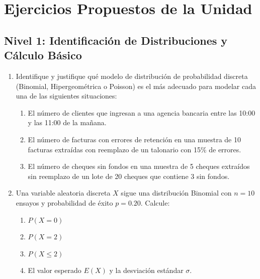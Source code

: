 \section{Ejercicios Propuestos de la Unidad}

\subsection*{Nivel 1: Identificación de Distribuciones y Cálculo Básico}
\begin{enumerate}
    \item Identifique y justifique qué modelo de distribución de probabilidad discreta (Binomial, Hipergeométrica o Poisson) es el más adecuado para modelar cada una de las siguientes situaciones:
    \begin{enumerate}[label=\alph*)]
        \item El número de clientes que ingresan a una agencia bancaria entre las 10:00 y las 11:00 de la mañana.
        \item El número de facturas con errores de retención en una muestra de 10 facturas extraídas con reemplazo de un talonario con 15\% de errores.
        \item El número de cheques sin fondos en una muestra de 5 cheques extraídos sin reemplazo de un lote de 20 cheques que contiene 3 sin fondos.
    \end{enumerate}
    \item Una variable aleatoria discreta $X$ sigue una distribución Binomial con $n = 10$ ensayos y probabilidad de éxito $p = 0.20$. Calcule:
    \begin{enumerate}[label=\alph*)]
        \item $P(X = 0)$
        \item $P(X = 2)$
        \item $P(X \le 2)$
        \item El valor esperado $E(X)$ y la desviación estándar $\sigma$.
    \end{enumerate}
\end{enumerate}

